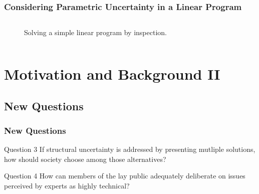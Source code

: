 

\begin{frame}
    \frametitle{Considering Parametric Uncertainty in a Linear Program}
    \begin{columns}
        \column[t]{10cm}
        \begin{figure}
            \centering
            \resizebox{0.75\columnwidth}{!}{}
            \caption{Solving a simple linear program by inspection.}
            \label{fig:param-uc}
        \end{figure}
    \end{columns}
\end{frame}







%
\section{Motivation and Background II}
\subsection{New Questions}
\begin{frame}
    \frametitle{New Questions}

    \begin{block}{Question 3}
        If structural uncertainty is addressed by presenting mutliple solutions,
        how should society choose among those alternatives?
    \end{block}

    \begin{block}{Question 4}
        How can members of the lay public adequately deliberate on issues
        perceived by experts as highly technical?
    \end{block}

\end{frame}

